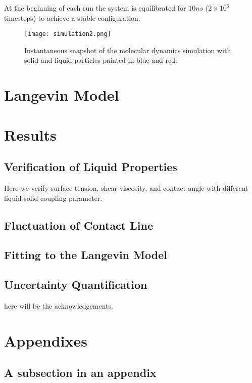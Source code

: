 \documentclass[
reprint,
 amsmath,amssymb,
 aps,
url
]{revtex4-1}
\begin{document}
At the beginning of each run the system is equilibrated for $10 ns$ ($2\times10^6$ timesteps) to achieve a stable configuration.  

\begin{figure}
	\texttt{[image: simulation2.png]}
	\caption{\label{fig:simulation2}Instantaneous snapshot of the  molecular dynamics simulation with solid and liquid particles painted in blue and red.}
\end{figure}

\section{Langevin Model}

\section{Results}

\subsection{Verification of Liquid Properties}

Here we verify surface tension, shear viscosity, and contact angle with different liquid-solid coupling parameter.

\subsection{Fluctuation of Contact Line}

\subsection{Fitting to the Langevin Model}

\subsection{Uncertainty Quantification}





\begin{acknowledgments}
here will be the acknowledgements.
\end{acknowledgments}

\appendix

\section{Appendixes}




\subsection{\label{app:subsec}A subsection in an appendix}


\nocite{*}

\end{document}
